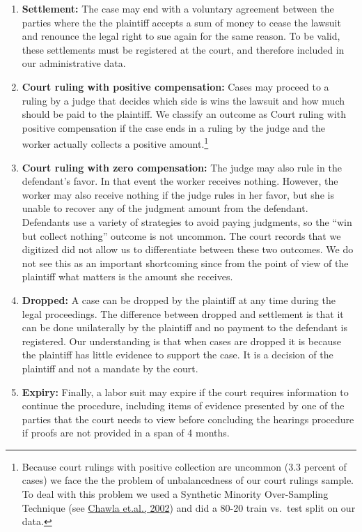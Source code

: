 \begin{enumerate}
    \item \textbf{Settlement:} The case may end with a voluntary agreement between the parties where the  the plaintiff accepts a sum of money to cease the lawsuit and renounce the legal right to sue again for the same reason. To be valid, these settlements must be registered at the court, and therefore included in our administrative data.  
    
    \item \textbf{Court ruling with positive compensation:} Cases may proceed to a ruling by a judge that decides which side is wins the lawsuit and how much should be paid to the plaintiff. We classify an outcome as Court ruling with positive compensation if the case ends in a ruling by the judge and the worker actually collects a positive amount.\footnote{Because court rulings with positive collection are uncommon (3.3 percent of cases) we face the the problem of unbalancedness of our court rulings sample. To deal with this problem we used a Synthetic Minority Over-Sampling Technique (see \href{http://jair.org/media/953/live-953-2037-jair.pdf}{Chawla et.al., 2002}) and did a 80-20 train vs.~test split on our data.}
    
    \item \textbf{Court ruling with zero compensation:}
    The judge may also rule in the defendant's favor. In that event the worker receives nothing. However, the worker may also receive nothing if the judge rules in her favor, but she is unable to recover any of the judgment amount from the defendant. Defendants use a variety of strategies to avoid paying judgments, so the “win but collect nothing” outcome is not uncommon. The court records that we digitized did not allow us to differentiate between these two outcomes. We do not see this as an important shortcoming since from the point of view of the plaintiff what matters is the amount she receives.
   
    \item \textbf{Dropped:} A case can be dropped by the plaintiff at any time during the legal proceedings. The difference between dropped and settlement is that it can be done unilaterally by the plaintiff and no payment to the defendant is registered. Our understanding is that when cases are dropped it is because the plaintiff has little evidence to support the case. It is a decision of the plaintiff and not a mandate by the court.
    
    \item \textbf{Expiry:} Finally, a labor suit may expire if the court requires information to continue the procedure, including items of evidence presented by one of the parties that the court needs to view before concluding the hearings procedure if proofs are not provided in a span of 4 months.

\end{enumerate}


